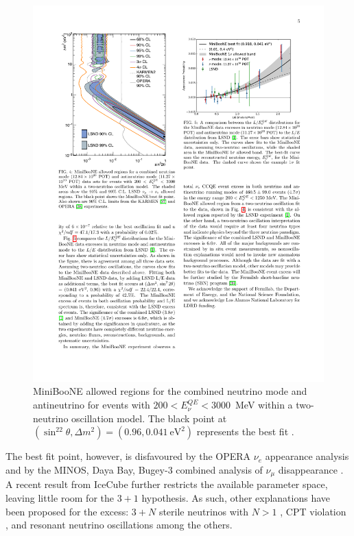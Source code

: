 \begin{figure}[htbp]
    \centering
    \includegraphics[width=0.7\linewidth]{figures/miniboone_bestfit.pdf}
    \caption{MiniBooNE allowed regions for the combined neutrino mode and antineutrino for events with $200<E_{\nu}^{QE}<3000$~MeV within a two-neutrino oscillation model. The black point at $( \sin^22\theta, \Delta m^2)=(0.96, 0.041~\mathrm{eV^2})$ represents the best fit \cite{Aguilar-Arevalo:2018gpe}.}
    \label{fig:miniboone_bestfit}
\end{figure}

The best fit point, however, is disfavoured by the OPERA $\nu_{e}$ appearance analysis \cite{Agafonova:2018dkb} and by the MINOS, Daya Bay, Bugey-3 combined analysis of $\nu_{\mu}$ disappearance \cite{Adamson:2016jku}. A recent result from IceCube \cite{TheIceCube:2016oqi} further restricts the available parameter space, leaving little room for the $3+1$ hypothesis. As such, other explanations have been proposed for the excess: $3+N$ sterile neutrinos with $N>1$ \cite{Conrad:2012qt}, CPT violation \cite{Kostelecky:2011gq}, and resonant neutrino oscillations \cite{Asaadi:2017bhx} among the others.


